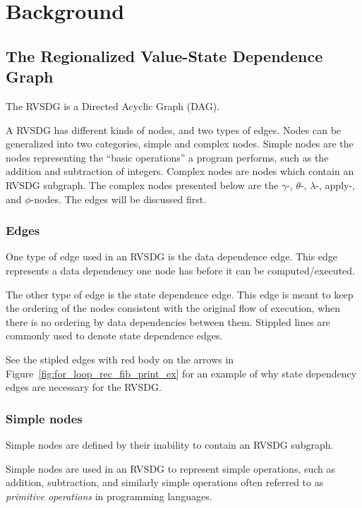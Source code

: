 
\clearpage
\section{Background}
\label{background}

\subsection{The Regionalized Value-State Dependence Graph}
\label{background:RVSDG}

The RVSDG is a Directed Acyclic Graph (DAG).

A RVSDG has different kinds of nodes, and two types of edges. Nodes can be
generalized into two categories, simple and complex nodes. Simple nodes are the
nodes representing the ``basic operations'' a program performs, such as the
addition and subtraction of integers. Complex nodes are nodes which contain an
RVSDG subgraph. The complex nodes presented below are the $\gamma$-, $\theta$-,
$\lambda$-, apply-, and $\phi$-nodes. The edges will be discussed first.

\subsubsection{Edges}

One type of edge used in an RVSDG is the data dependence edge. This edge
represents a data dependency one node has before it can be computed/executed.

The other type of edge is the state dependence edge. This edge is meant to keep
the ordering of the nodes consistent with the original flow of execution, when
there is no ordering by data dependencies between them. Stippled lines are
commonly used to denote state dependence edges.

See the stipled edges with red body on the arrows in
Figure~\ref{fig:for_loop_rec_fib_print_ex} for an example of why state
dependency edges are necessary for the RVSDG.

\subsubsection{Simple nodes}

Simple nodes are defined by their inability to contain an RVSDG subgraph.

Simple nodes are used in an RVSDG to represent simple operations, such as
addition, subtraction, and similarly simple operations often referred to as
\textit{primitive operations} in programming languages.

